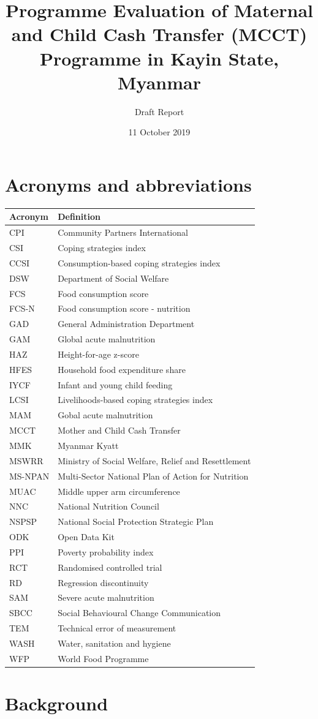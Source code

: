 \documentclass[12pt,a4paper]{article}
\title{\vspace{8cm} \LARGE{Programme Evaluation of Maternal and Child Cash Transfer (MCCT) Programme in Kayin State, Myanmar}}
\subtitle{Draft Report}
\author{}
\date{11 October 2019}
\begin{document}
\maketitle

\newpage

{
\hypersetup{linkcolor=black}
\setcounter{tocdepth}{3}
\tableofcontents
}
\listoftables
\listoffigures
\newpage

\hypertarget{acronyms-and-abbreviations}{%
\section*{Acronyms and abbreviations}\label{acronyms-and-abbreviations}}

\begin{longtable}[]{@{}ll@{}}
\toprule
Acronym & Definition\tabularnewline
\midrule
\endhead
CPI & Community Partners International\tabularnewline
CSI & Coping strategies index\tabularnewline
CCSI & Consumption-based coping strategies index\tabularnewline
DSW & Department of Social Welfare\tabularnewline
FCS & Food consumption score\tabularnewline
FCS-N & Food consumption score - nutrition\tabularnewline
GAD & General Administration Department\tabularnewline
GAM & Global acute malnutrition\tabularnewline
HAZ & Height-for-age z-score\tabularnewline
HFES & Household food expenditure share\tabularnewline
IYCF & Infant and young child feeding\tabularnewline
LCSI & Livelihoods-based coping strategies index\tabularnewline
MAM & Gobal acute malnutrition\tabularnewline
MCCT & Mother and Child Cash Transfer\tabularnewline
MMK & Myanmar Kyatt\tabularnewline
MSWRR & Ministry of Social Welfare, Relief and Resettlement\tabularnewline
MS-NPAN & Multi-Sector National Plan of Action for Nutrition\tabularnewline
MUAC & Middle upper arm circumference\tabularnewline
NNC & National Nutrition Council\tabularnewline
NSPSP & National Social Protection Strategic Plan\tabularnewline
ODK & Open Data Kit\tabularnewline
PPI & Poverty probability index\tabularnewline
RCT & Randomised controlled trial\tabularnewline
RD & Regression discontinuity\tabularnewline
SAM & Severe acute malnutrition\tabularnewline
SBCC & Social Behavioural Change Communication\tabularnewline
TEM & Technical error of measurement\tabularnewline
WASH & Water, sanitation and hygiene\tabularnewline
WFP & World Food Programme\tabularnewline
\bottomrule
\end{longtable}

\newpage

\hypertarget{background}{%
\section{Background}\label{background}}
\end{document}
